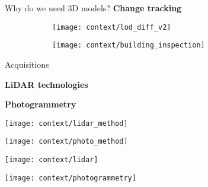 \begin{frame}[t]{Why do we need 3D models?}
	\textbf{Change tracking}
	\vfill
	\begin{figure}
		\centering
		\begin{subfigure}[t]{0.45\linewidth}
			\texttt{[image: context/lod\_diff\_v2]}
		\end{subfigure}%
		\hfill%
		\begin{subfigure}[t]{0.45\linewidth}
			\texttt{[image: context/building\_inspection]}
		\end{subfigure}
	\end{figure}	
\end{frame}

\begin{frame}{Acquisitions}
	\small
	\centering
	\begin{minipage}{0.5\linewidth}
		\centering
		\textbf{LiDAR technologies}
	\end{minipage}%
	\begin{minipage}{0.5\linewidth}
		\centering
		\textbf{Photogrammetry}
	\end{minipage}

	\begin{minipage}{0.5\linewidth}
		\centering
		\texttt{[image: context/lidar\_method]}			
	\end{minipage}%
	\begin{minipage}{0.5\linewidth}
		\centering
		\texttt{[image: context/photo\_method]}
	\end{minipage}

	\begin{minipage}{0.5\linewidth}
		\centering
		\texttt{[image: context/lidar]}	
	\end{minipage}%
	\begin{minipage}{0.5\linewidth}
		\centering
		\texttt{[image: context/photogrammetry]}	
	\end{minipage}%
	
\end{frame}

